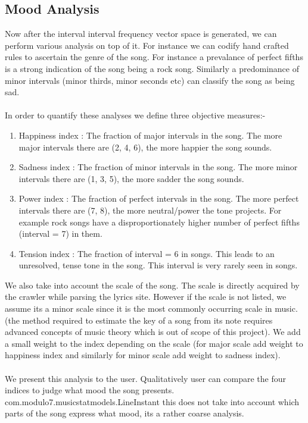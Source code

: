 \documentclass[letterpaper, 11pt]{article}
\begin{document}
\subsection*{Mood Analysis}
Now after the interval interval frequency vector space is generated, we can perform various analysis on top of it. For instance we can codify hand crafted rules to ascertain the genre of the song. For instance a prevalance of perfect fifths is a strong indication of the song being a rock song. Similarly a predominance of minor intervals (minor thirds, minor seconds etc) can classify the song as being sad. \\\\
In order to quantify these analyses we define three objective measures:-
\begin{enumerate}
\item Happiness index : The fraction of major intervals in the song. The more major intervals there are (2, 4, 6), the more happier the song sounds. 
\item Sadness index : The fraction of minor intervals in the song. The more minor intervals there are (1, 3, 5), the more sadder the song sounds. 
\item Power index : The fraction of perfect intervals in the song. The more perfect intervals there are (7, 8), the more neutral/power the tone projects. For example rock songs have a disproportionately higher number of perfect fifths (interval = 7) in them.
\item Tension index : The fraction of interval = 6 in songs. This leads to an unresolved, tense tone in the song. This interval is very rarely seen in songs.
\end{enumerate}
We also take into account the scale of the song. The scale is directly acquired by the crawler while parsing the lyrics site. However if the scale is not listed, we assume its a minor scale since it is the most commonly occurring scale in music. (the method required to estimate the key of a song from its note requires advanced concepts of music theory which is out of scope of this project). We add a small weight to the index depending on the scale (for major scale add weight to happiness index and similarly for minor scale add weight to sadness index). \\\\
We present this analysis to the user. Qualitatively user can compare the four indices to judge what mood the song presents. com.modulo7.musicstatmodels.LineInstant this does not take into account which parts of the song express what mood, its a rather coarse analysis.
\end{document}
